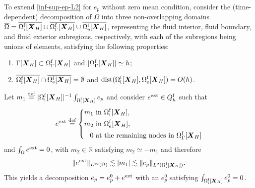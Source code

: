 \documentclass[11pt,reqno]{amsart}
\theoremstyle{definition}
\theoremstyle{plain}
\numberwithin{theorem}{section}
\numberwithin{proposition}{section}
\numberwithin{lemma}{section}
\numberwithin{equation}{section}
\newcommand{\bs}[1]{\boldsymbol{#1}}
\renewcommand{\(}{\bigl(}
\renewcommand{\)}{\bigr)}
\def\eqd{\stackrel{\mathrm{def}}{=}}
\begin{document}
To extend  \eqref{inf-sup-ep-L2} for $e_p$ without zero mean condition, consider the (time-dependent) decomposition of $\Omega$ into three non-overlapping domains $\overline{\Omega}=\overline{\Omega^{\rm f}_{\rm i}[{\bs X}_H]} \cup \overline{\Omega^{\rm f}_{\Gamma}[{\bs X}_H]} \cup \overline{\Omega^{\rm f}_{\rm e}[{\bs X}_H]}$, representing the fluid interior, fluid boundary, and fluid exterior subregions, respectively, with each of the subregions being unions of elements, satisfying the following properties:
\begin{enumerate}
\item 
$\Gamma[{\bs X}_H]\subset\Omega^{\rm f}_{\Gamma}[{\bs X}_H]$ and 
$|\Omega^{\rm f}_{\Gamma}[{\bs X}_H]|\simeq h$;

\item
$\overline{\Omega^{\rm f}_{\rm i}[{\bs X}_H]}\cap \overline{\Omega^{\rm f}_{\rm e}[{\bs X}_H]}=\emptyset$ 
and ${\rm dist}(\Omega^{\rm f}_{\rm i}[{\bs X}_H], \Omega^{\rm f}_{\rm e}[{\bs X}_H])=O(h)$. 
\end{enumerate}
Let $m_1 \eqd |\Omega^{\rm f}_{\rm i}[{\bs X}_H]|^{-1} \int_{\Omega^{\rm f}_{\rm i}[{\bs X}_H]}e_p$ and consider $e^{\rm ext}\in Q_h^{\rm f}$ such that 
\[
e^{\rm ext} \eqd \left\{\begin{aligned}
     m_1& \text{ in }\Omega^{\rm f}_{\rm i}[{\bs X}_H] , \\
     m_2& \text{ in }\Omega^{\rm f}_{\rm e}[{\bs X}_H] ,\\
     0 & \text{ at the remaining nodes in }\Omega^{\rm f}_{\Gamma}[{\bs X}_H] 
\end{aligned}\right.
\]
and $\int_{\Omega}e^{\rm ext}=0$,
with $m_2\in\mathbb{R}$ satisfying $m_2\simeq -m_1$ and therefore 
$$
\|e^{\rm ext}\|_{L^\infty(\Omega)}
\lesssim |m_1| 
\lesssim \|e_p\|_{L^2(\Omega^{\rm f}_i[{\bs X}_H])}  .
$$
This yields a decomposition $e_p = e_p^0 + e^{\rm ext}$ with an $e_p^0$ satisfying $\int_{\Omega^{\rm f}_{\rm i}[{\bs X}_H]}e_p^0=0$. 
\end{document}
